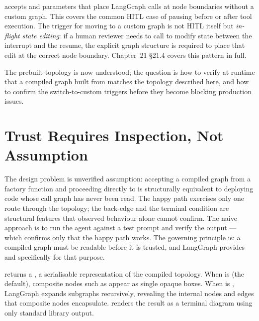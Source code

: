 \begin{notebox}
 accepts  and
 parameters that place LangGraph 
calls at node boundaries without a custom graph. This covers the common
HITL case of pausing before or after tool execution. The trigger for
moving to a custom graph is not HITL itself but \emph{in-flight state
editing}: if a human reviewer needs to call 
to modify state between the interrupt and the resume, the explicit graph
structure is required to place that edit at the correct node boundary.
Chapter~21 \S21.4 covers this pattern in full.
\end{notebox}

The prebuilt topology is now understood; the question is how to verify at
runtime that a compiled graph built from  matches
the topology described here, and how to confirm the switch-to-custom
triggers before they become blocking production issues.


\section{Trust Requires Inspection, Not Assumption}
\label{sec:react-internals}

The design problem is unverified assumption: accepting a compiled graph from
a factory function and proceeding directly to  is structurally
equivalent to deploying code whose call graph has never been read. The
happy path exercises only one route through the topology; the
 back-edge and the terminal condition are structural
features that observed behaviour alone cannot confirm. The naive approach is
to run the agent against a test prompt and verify the output --- which
confirms only that the happy path works. The governing principle is: a
compiled graph must be readable before it is trusted, and LangGraph provides
 and  specifically for that purpose.

 returns a ,
a serialisable representation of the compiled topology. When  is
 (the default), composite nodes such as  appear
as single opaque boxes. When  is , LangGraph expands
subgraphs recursively, revealing the internal nodes and edges that composite
nodes encapsulate.  renders the result as
a terminal diagram using only standard library output.

